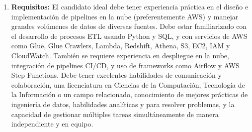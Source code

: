 \documentclass[12pt]{article}
\begin{document}
\begin{enumerate}
                    \item \textbf{Requisitos:}
                        El candidato ideal debe tener experiencia práctica en el diseño e implementación de pipelines en la nube (preferentemente AWS) y manejar grandes volúmenes de datos de diversas fuentes. Debe estar familiarizado con el desarrollo de procesos ETL usando Python y SQL, y con servicios de AWS como Glue, Glue Crawlers, Lambda, Redshift, Athena, S3, EC2, IAM y CloudWatch. También se requiere experiencia en despliegue en la nube, integración de pipelines CI/CD, y uso de frameworks como Airflow y AWS Step Functions. Debe tener excelentes habilidades de comunicación y colaboración, una licenciatura en Ciencias de la Computación, Tecnología de la Información o un campo relacionado, conocimiento de mejores prácticas de ingeniería de datos, habilidades analíticas y para resolver problemas, y la capacidad de gestionar múltiples tareas simultáneamente de manera independiente y en equipo.

                \end{enumerate}
\end{document}

